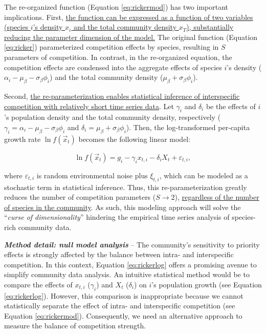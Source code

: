 \documentclass[12pt, class=article, crop=false]{standalone}
\begin{document}
The re-organized function (Equation \ref{eq:rickermod}) has two important implications.
First, \ul{the function can be expressed as a function of two variables (species $i$'s density $x_i$ and the total community density $x_T$), substantially reducing the parameter dimension of the model.}
The original function (Equation \ref{eq:ricker}) parameterized competition effects by species, resulting in $S$ parameters of competition.
In contrast, in the re-organized equation, the competition effects are condensed into the aggregate effects of species $i$'s density ($\alpha_i - \mu_{\beta} - \sigma_{\beta} \phi_i$) and the total community density ($\mu_{\beta} + \sigma_{\beta} \phi_i$).

Second, \ul{the re-parameterization enables statistical inference of interspecific competition with relatively short time series data}.
Let $\gamma_i$ and $\delta_i$ be the effects of $i$'s population density and the total community density, respectively ($\gamma_i = \alpha_i - \mu_{\beta} - \sigma_{\beta} \phi_i$ and $\delta_i = \mu_{\beta} + \sigma_{\beta} \phi_i$).
Then, the log-transformed per-capita growth rate $\ln f(\overset{\rightarrow}{x}_{t})$ becomes the following linear model:

\begin{equation}
\label{eq:rickerlog}
    \ln f(\overset{\rightarrow}{x}_{t}) = g_i - \gamma_i x_{t,i} - \delta_i X_t + \varepsilon_{t,i},
\end{equation}

where $\varepsilon_{t,i}$ is random environmental noise plus $\xi_{t,i}$, which can be modeled as a stochastic term in statistical inference. Thus, this re-parameterization greatly reduces the number of competition parameters ($S \rightarrow 2$), \ul{regardless of the number of species in the community}.
As such, this modeling approach will solve the ``\textit{curse of dimensionality}'' hindering the empirical time series analysis of species-rich community data.

\textbf{\textit{Method detail: null model analysis}} --
The community's sensitivity to priority effects is strongly affected by the balance between intra- and interspecific competition.
In this context, Equation \ref{eq:rickerlog} offers a promising avenue to simplify community data analysis. 
An intuitive statistical method would be to compare the effects of $x_{t,i}$ ($\gamma_i$) and $X_t$ ($\delta_i$) on $i$'s population growth (see Equation \ref{eq:rickerlog}).
However, this comparison is inappropriate because we cannot statistically separate the effect of intra- and interspecific competition (see Equation \ref{eq:rickermod}).
Consequently, we need an alternative approach to measure the balance of competition strength.
\end{document}
